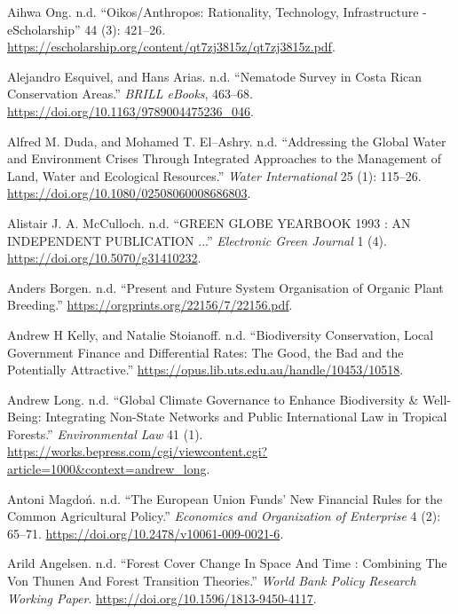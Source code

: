 \begin{CSLReferences}{1}{0}
Aihwa Ong. n.d. {``Oikos/Anthropos: Rationality, Technology,
Infrastructure - eScholarship''} 44 (3): 421--26.
\url{https://escholarship.org/content/qt7zj3815z/qt7zj3815z.pdf}.

Alejandro Esquivel, and Hans Arias. n.d. {``Nematode Survey in Costa
Rican Conservation Areas.''} \emph{BRILL eBooks}, 463--68.
\url{https://doi.org/10.1163/9789004475236_046}.

Alfred M. Duda, and Mohamed T. El--Ashry. n.d. {``Addressing the Global
Water and Environment Crises Through Integrated Approaches to the
Management of Land, Water and Ecological Resources.''} \emph{Water
International} 25 (1): 115--26.
\url{https://doi.org/10.1080/02508060008686803}.

Alistair J. A. McCulloch. n.d. {``GREEN GLOBE YEARBOOK 1993 : AN
INDEPENDENT PUBLICATION ...''} \emph{Electronic Green Journal} 1 (4).
\url{https://doi.org/10.5070/g31410232}.

Anders Borgen. n.d. {``Present and Future System Organisation of Organic
Plant Breeding.''} \url{https://orgprints.org/22156/7/22156.pdf}.

Andrew H Kelly, and Natalie Stoianoff. n.d. {``Biodiversity
Conservation, Local Government Finance and Differential Rates: The Good,
the Bad and the Potentially Attractive.''}
\url{https://opus.lib.uts.edu.au/handle/10453/10518}.

Andrew Long. n.d. {``Global Climate Governance to Enhance Biodiversity
\& Well-Being: Integrating Non-State Networks and Public International
Law in Tropical Forests.''} \emph{Environmental Law} 41 (1).
\url{https://works.bepress.com/cgi/viewcontent.cgi?article=1000&context=andrew_long}.

Antoni Magdoń. n.d. {``The European Union Funds' New Financial Rules for
the Common Agricultural Policy.''} \emph{Economics and Organization of
Enterprise} 4 (2): 65--71.
\url{https://doi.org/10.2478/v10061-009-0021-6}.

Arild Angelsen. n.d. {``Forest Cover Change In Space And Time :
Combining The Von Thunen And Forest Transition Theories.''} \emph{World
Bank Policy Research Working Paper}.
\url{https://doi.org/10.1596/1813-9450-4117}.


\end{CSLReferences}
